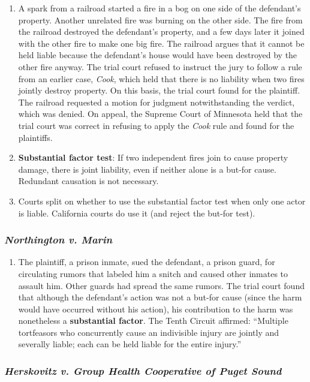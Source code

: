 \begin{enumerate}
    \item A spark from a railroad started a fire in a bog on one side of the defendant's property. Another unrelated fire was burning on the other side. The fire from the railroad destroyed the defendant's property, and a few days later it joined with the other fire to make one big fire. The railroad argues that it cannot be held liable because the defendant's house would have been destroyed by the other fire anyway. The trial court refused to instruct the jury to follow a rule from an earlier case, \emph{Cook}, which held that there is no liability when two fires jointly destroy property. On this basis, the trial court found for the plaintiff. The railroad requested a motion for judgment notwithstanding the verdict, which was denied. On appeal, the Supreme Court of Minnesota held that the trial court was correct in refusing to apply the \emph{Cook} rule and found for the plaintiffs.
    \item \textbf{Substantial factor test}: If two independent fires join to cause property damage, there is joint liability, even if neither alone is a but-for cause. Redundant causation is not necessary.
    \item Courts split on whether to use the substantial factor test when only one actor is liable. California courts do use it (and reject the but-for test).
\end{enumerate}

\subsubsection{\emph{Northington v. Marin}}

\begin{enumerate}
    \item The plaintiff, a prison inmate, sued the defendant, a prison guard, for circulating rumors that labeled him a snitch and caused other inmates to assault him. Other guards had spread the same rumors. The trial court found that although the defendant's action was not a but-for cause (since the harm would have occurred without his action), his contribution to the harm was nonetheless a \textbf{substantial factor}. The Tenth Circuit affirmed: ``Multiple tortfeasors who concurrently cause an indivisible injury are jointly and severally liable; each can be held liable for the entire injury.''
\end{enumerate}

\subsubsection{\emph{Herskovitz v. Group Health Cooperative of Puget Sound}}

